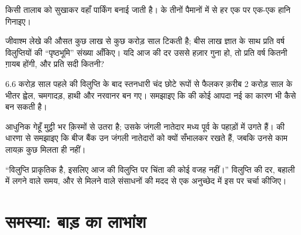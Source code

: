 \begin{exercise}[$\star\star$]\label{exo:g10:biodiversity-scales:11}
किसी तालाब को सुखाकर वहाँ पार्किंग बनाई जाती है।  के तीनों
पैमानों में से हर एक पर एक-एक हानि गिनाइए।
\end{exercise}

\begin{exercise}[$\star\star\star$]\label{exo:g10:biodiversity-scales:12}
जीवाश्म लेखे की औसत  कुछ लाख से कुछ करोड़ साल टिकती है; बीस लाख
ज्ञात  के साथ प्रति वर्ष विलुप्तियों की ``पृष्ठभूमि'' संख्या
आँकिए। यदि आज की दर उससे हज़ार गुना हो, तो प्रति वर्ष कितनी 
ग़ायब होंगी, और प्रति सदी कितनी?
\end{exercise}

\begin{exercise}[$\star\star\star$]\label{exo:g10:biodiversity-scales:13}
6.6 करोड़ साल पहले की विलुप्ति के बाद स्तनधारी चंद छोटे रूपों से फैलकर
क़रीब 2 करोड़ साल के भीतर ह्वेल, चमगादड़, हाथी और नरवानर बन गए। समझाइए
कि  की कोई आपदा नई  का कारण भी कैसे बन सकती है।
\end{exercise}

\begin{exercise}[$\star\star\star$]\label{exo:g10:biodiversity-scales:14}
आधुनिक गेहूँ मुट्ठी भर क़िस्मों से उतरा है; उसके जंगली नातेदार मध्य पूर्व
के पहाड़ों में उगते हैं।  की धारणा से समझाइए कि बीज बैंक
उन जंगली नातेदारों को क्यों सँभालकर रखते हैं, जबकि उनसे काम लायक़ कुछ
मिलता ही नहीं।
\end{exercise}

\begin{exercise}[$\star\star\star$]\label{exo:g10:biodiversity-scales:15}
``विलुप्ति प्राकृतिक है, इसलिए आज की विलुप्ति पर चिंता की कोई वजह नहीं।''
विलुप्ति की दर, बहाली में लगने वाले समय, और  से मिलने वाले
संसाधनों की मदद से एक अनुच्छेद में इस पर चर्चा कीजिए।
\end{exercise}

\section{समस्या: बाड़ का लाभांश}

